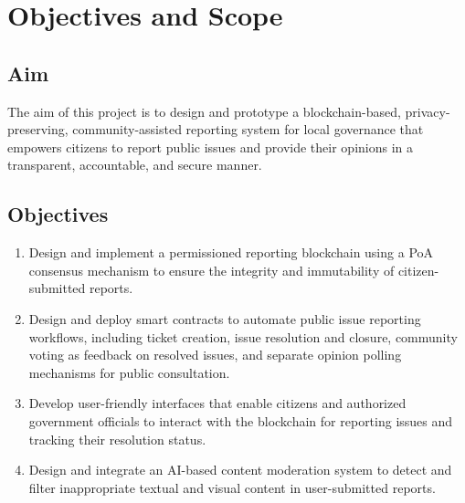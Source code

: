 
\section{Objectives and Scope}
\subsection{Aim}

The aim of this project is to design and prototype a blockchain-based, privacy-preserving, community-assisted reporting system for local governance that empowers citizens to report public issues and provide their opinions in a transparent, accountable, and secure manner.

\subsection{Objectives}

\begin{enumerate}
\item Design and implement a permissioned reporting blockchain using a \ac{PoA} consensus mechanism to ensure the integrity and immutability of citizen-submitted reports.


\item Design and deploy smart contracts to automate public issue reporting workflows, including ticket creation, issue resolution and closure, community voting as feedback on resolved issues, and separate opinion polling mechanisms for public consultation.

\item Develop user-friendly interfaces that enable citizens and authorized government officials to interact with the blockchain for reporting issues and tracking their resolution status.

\item Design and integrate an AI-based content moderation system to detect and filter inappropriate textual and visual content in user-submitted reports.


\end{enumerate}


